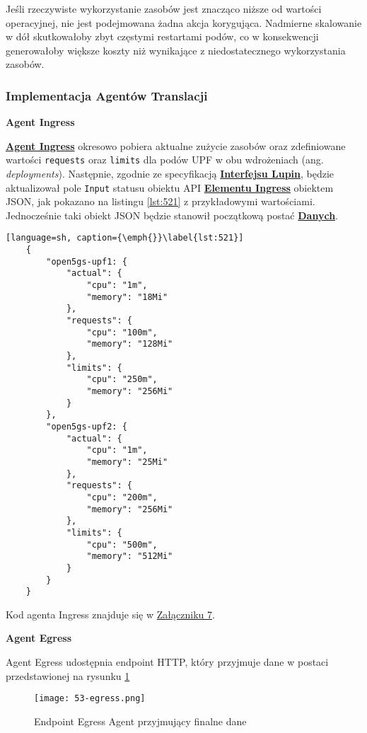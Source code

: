 Jeśli rzeczywiste wykorzystanie zasobów jest znacząco niższe od wartości operacyjnej, nie jest podejmowana żadna akcja korygująca. Nadmierne skalowanie w dół skutkowałoby zbyt częstymi restartami podów, co w konsekwencji generowałoby większe koszty niż wynikające z niedostatecznego wykorzystania zasobów.

\subsubsection{Implementacja Agentów Translacji}

\textbf{Agent Ingress}

\hyperlink{def:agent-ingress}{\textbf{Agent Ingress}} okresowo pobiera aktualne zużycie zasobów oraz zdefiniowane wartości \texttt{requests} oraz \texttt{limits} dla podów UPF w obu wdrożeniach (ang. \textit{deployments}). Następnie, zgodnie ze specyfikacją \hyperlink{def:interfejs-lupin}{\textbf{Interfejsu Lupin}}, będzie aktualizował pole \texttt{Input} statusu obiektu API \hyperlink{def:element-ingres}{\textbf{Elementu Ingress}} obiektem JSON, jak pokazano na listingu \ref{lst:521} z przykładowymi wartościami. Jednocześnie taki obiekt JSON będzie stanowił początkową postać \hyperlink{def:dane}{\textbf{Danych}}.

\begin{lstlisting}[language=sh, caption={\emph{}}\label{lst:521}]
    {
        "open5gs-upf1: {
            "actual": {
                "cpu": "1m",
                "memory": "18Mi"
            },
            "requests": {
                "cpu": "100m",
                "memory": "128Mi"
            },
            "limits": {
                "cpu": "250m",
                "memory": "256Mi"
            }
        },
        "open5gs-upf2: {
            "actual": {
                "cpu": "1m",
                "memory": "25Mi"
            },
            "requests": {
                "cpu": "200m",
                "memory": "256Mi"
            },
            "limits": {
                "cpu": "500m",
                "memory": "512Mi"
            }
        }
    }
\end{lstlisting}

Kod agenta Ingress znajduje się w \hyperlink{appengix:7}{Załączniku 7}.

\textbf{Agent Egress}

Agent Egress udostępnia endpoint HTTP, który przyjmuje dane w postaci przedstawionej na rysunku \ref{fig:53-egress}

\begin{figure}[!h]
    \centering \texttt{[image: 53-egress.png]}
    \caption{Endpoint Egress Agent przyjmujący finalne dane}\label{fig:53-egress}
\end{figure}


